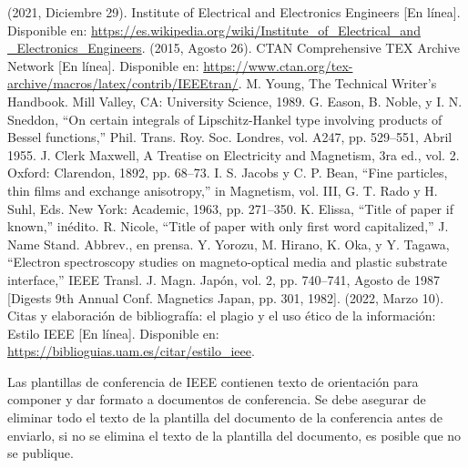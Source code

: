 \documentclass[letterpaper, 10pt, conference]{IEEEtran} %
\begin{document}
	\begin{thebibliography}{00}
		 (2021, Diciembre 29). Institute of Electrical and Electronics Engineers [En línea]. Disponible en: \href{https://es.wikipedia.org/wiki/Institute_of_Electrical_and_Electronics_Engineers}{https://es.wikipedia.org/wiki/Institute\_of\_Electrical\_and \_Electronics\_Engineers}.
		 (2015, Agosto 26). CTAN Comprehensive TEX Archive Network [En línea]. Disponible en: \href{https://www.ctan.org/tex-archive/macros/latex/contrib/IEEEtran/}{https://www.ctan.org/tex-archive/macros/latex/contrib/IEEEtran/}.
		 M. Young, The Technical Writer's Handbook. Mill Valley, CA: University Science, 1989.
		 G. Eason, B. Noble, y I. N. Sneddon, ``On certain integrals of Lipschitz-Hankel type involving products of Bessel functions,'' Phil. Trans. Roy. Soc. Londres, vol. A247, pp. 529--551, Abril 1955.
		 J. Clerk Maxwell, A Treatise on Electricity and Magnetism, 3ra ed., vol. 2. Oxford: Clarendon, 1892, pp. 68--73.
		 I. S. Jacobs y C. P. Bean, ``Fine particles, thin films and exchange anisotropy,'' in Magnetism, vol. III, G. T. Rado y H. Suhl, Eds. New York: Academic, 1963, pp. 271--350.
		 K. Elissa, ``Title of paper if known,'' inédito.
		 R. Nicole, ``Title of paper with only first word capitalized,'' J. Name Stand. Abbrev., en prensa.
		 Y. Yorozu, M. Hirano, K. Oka, y Y. Tagawa, ``Electron spectroscopy studies on magneto-optical media and plastic substrate interface,'' IEEE Transl. J. Magn. Japón, vol. 2, pp. 740--741, Agosto de 1987 [Digests 9th Annual Conf. Magnetics Japan, pp. 301, 1982].
		 (2022, Marzo 10). Citas y elaboración de bibliografía: el plagio y el uso ético de la información: Estilo IEEE [En línea]. Disponible en: \href{https://biblioguias.uam.es/citar/estilo_ieee}{https://biblioguias.uam.es/citar/estilo\_ieee}.
	\end{thebibliography}
	
	\vspace{12pt}
	\color{red}
	Las plantillas de conferencia de IEEE contienen texto de orientación para componer y dar formato a documentos de conferencia. Se debe asegurar de eliminar todo el texto de la plantilla del documento de la conferencia antes de enviarlo, si no se elimina el texto de la plantilla del documento, es posible que no se publique.
\end{document}
